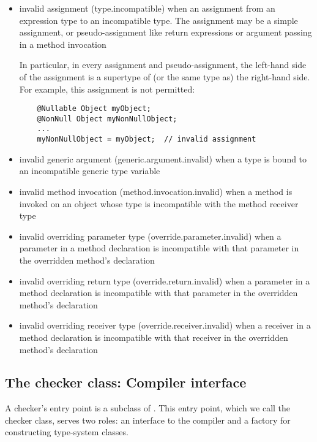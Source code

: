 \begin{itemize}

\item invalid assignment (type.incompatible) when an assignment from
  an expression type to an incompatible type.  The assignment may be a
  simple assignment, or pseudo-assignment like return expressions or
  argument passing in a method invocation

  In particular, in every assignment and pseudo-assignment, the
  left-hand side of the assignment is a supertype of (or the same type
  as) the right-hand side.  For example, this assignment is not
  permitted:

  \begin{Verbatim}
    @Nullable Object myObject;
    @NonNull Object myNonNullObject;
    ...
    myNonNullObject = myObject;  // invalid assignment
  \end{Verbatim}

\item invalid generic argument (generic.argument.invalid) when a type
  is bound to an incompatible generic type variable

\item invalid method invocation (method.invocation.invalid) when a
  method is invoked on an object whose type is incompatible with the
  method receiver type

\item invalid overriding parameter type (override.parameter.invalid)
  when a parameter in a method declaration is incompatible with that
  parameter in the overridden method's declaration

\item invalid overriding return type (override.return.invalid) when a
  parameter in a method declaration is incompatible with that
  parameter in the overridden method's declaration

\item invalid overriding receiver type (override.receiver.invalid)
  when a receiver in a method declaration is incompatible with that
  receiver in the overridden method's declaration

\end{itemize}


\subsection{The checker class:  Compiler interface\label{writing-compiler-interface}}

A checker's entry point is a subclass of .  This entry
point, which we call the checker class, serves two
roles:  an interface to the compiler and a factory for constructing
type-system classes.

